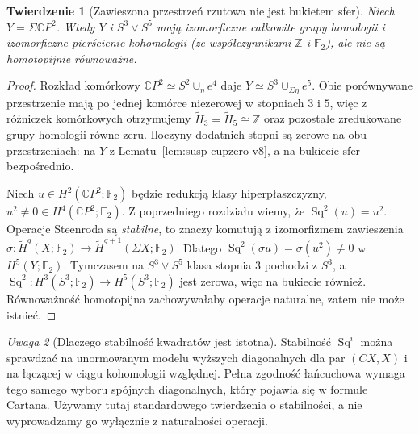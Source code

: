 \documentclass[11pt,a4paper,oneside]{report}
\newcommand{\F}{\mathbb{F}}
\newcommand{\C}{\mathbb{C}}
\newcommand{\Z}{\mathbb{Z}}
\theoremstyle{plain}
\newtheorem{twierdzenie}{Twierdzenie}[section]
\theoremstyle{definition}
\theoremstyle{remark}
\newtheorem{uwaga}[twierdzenie]{Uwaga}
\begin{document}
\begin{twierdzenie}[Zawieszona przestrzeń rzutowa nie jest bukietem sfer]
\label{thm:sigma-cp2-v8}
Niech $Y=\Sigma\C P^2$. Wtedy $Y$ i $S^3\vee S^5$
mają izomorficzne całkowite grupy homologii i izomorficzne
pierścienie kohomologii (ze współczynnikami $\Z$ i $\F_2$),
ale nie są homotopijnie równoważne.
\end{twierdzenie}
\begin{proof}
Rozkład komórkowy $\C P^2\simeq S^2\cup_\eta e^4$
daje $Y\simeq S^3\cup_{\Sigma\eta}e^5$.
Obie porównywane przestrzenie mają po jednej komórce
niezerowej w stopniach $3$ i $5$, więc z różniczek
komórkowych otrzymujemy
$\widetilde H_3=\widetilde H_5\cong\Z$ oraz pozostałe
zredukowane grupy homologii równe zeru.
Iloczyny dodatnich stopni są zerowe na obu przestrzeniach:
na $Y$ z Lematu~\ref{lem:susp-cupzero-v8}, a na bukiecie
sfer bezpośrednio.

Niech $u\in H^2(\C P^2;\F_2)$ będzie redukcją klasy
hiperpłaszczyzny, $u^2\ne0\in H^4(\C P^2;\F_2)$.
Z poprzedniego rozdziału wiemy, że
$\operatorname{Sq}^2(u)=u^2$.
Operacje Steenroda są \emph{stabilne}, to znaczy
komutują z izomorfizmem zawieszenia
$\sigma:\widetilde H^q(X;\F_2)\to
\widetilde H^{q+1}(\Sigma X;\F_2)$.
Dlatego
$\operatorname{Sq}^2(\sigma u)=\sigma(u^2)\ne0$
w $H^5(Y;\F_2)$.
Tymczasem na $S^3\vee S^5$ klasa stopnia $3$
pochodzi z $S^3$, a
$\operatorname{Sq}^2:H^3(S^3;\F_2)\to H^5(S^3;\F_2)$
jest zerowa, więc na bukiecie również.
Równoważność homotopijna zachowywałaby operacje
naturalne, zatem nie może istnieć.
\end{proof}

\begin{uwaga}[Dlaczego stabilność kwadratów jest istotna]
Stabilność $\operatorname{Sq}^i$ można sprawdzać na
unormowanym modelu wyższych diagonalnych dla par
$(CX,X)$ i na łączącej w ciągu kohomologii względnej.
Pełna zgodność łańcuchowa wymaga tego samego wyboru
spójnych diagonalnych, który pojawia się w formule Cartana.
Używamy tutaj standardowego twierdzenia o stabilności,
a nie wyprowadzamy go wyłącznie z naturalności operacji.
\end{uwaga}
\end{document}

